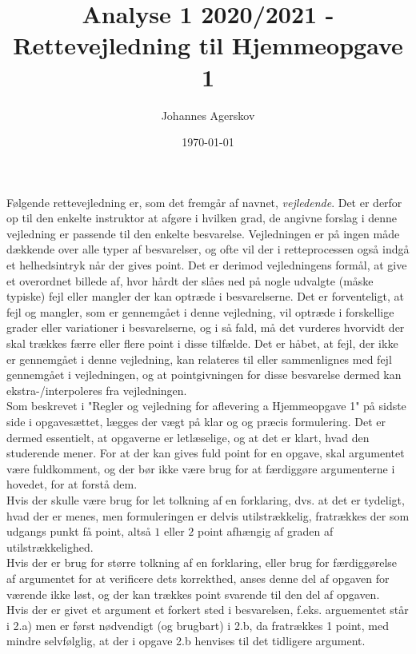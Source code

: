 \documentclass{article}
\title{Analyse 1 2020/2021 - Rettevejledning til Hjemmeopgave 1}
\author{Johannes Agerskov}
\date{\today}
\begin{document}
	
	\maketitle
Følgende rettevejledning er, som det fremgår af navnet, \emph{vejledende}. Det er derfor op til den enkelte instruktor at afgøre i hvilken grad, de angivne forslag i denne vejledning er passende til den enkelte besvarelse. Vejledningen er på ingen måde dækkende over alle typer af besvarelser, og ofte vil der i retteprocessen også indgå et helhedsintryk når der gives point. Det er derimod vejledningens formål, at give et overordnet billede af, hvor hårdt der slåes ned på nogle udvalgte (måske typiske) fejl eller mangler der kan optræde i besvarelserne. Det er forventeligt, at fejl og mangler, som er gennemgået i denne vejledning, vil optræde i forskellige grader eller variationer i besvarelserne, og i så fald, må det vurderes hvorvidt der skal trækkes færre eller flere point i disse tilfælde. Det er håbet, at fejl, der ikke er gennemgået i denne vejledning, kan relateres til eller sammenlignes med fejl gennemgået i vejledningen, og at pointgivningen for disse besvarelse dermed kan ekstra-/interpoleres fra vejledningen.
\vspace*{0.5cm}\\
Som beskrevet i "Regler og vejledning for aflevering a Hjemmeopgave 1" på sidste side i opgavesættet, lægges der vægt på klar og og præcis formulering. Det er dermed essentielt, at opgaverne er letlæselige, og at det er klart, hvad den studerende mener. For at der kan gives fuld point for en opgave, skal argumentet være fuldkomment, og der bør ikke være brug for at færdiggøre argumenterne i hovedet, for at forstå dem.
\vspace*{0.2cm}
\\
Hvis der skulle være brug for let tolkning af en forklaring, dvs. at det er tydeligt, hvad der er menes, men formuleringen er delvis utilstrækkelig, fratrækkes der som udgangs punkt få point, altså $ 1 $ eller $ 2 $ point afhængig af graden af utilstrækkelighed.
\vspace*{0.2cm}\\
Hvis der er brug for større tolkning af en forklaring, eller brug for færdiggørelse af argumentet for at verificere dets korrekthed, anses denne del af opgaven for værende ikke løst, og der kan trækkes point svarende til den del af opgaven.
\vspace*{0.2cm}\\
Hvis der er givet et argument et forkert sted i besvarelsen, f.eks. arguementet står i 2.a) men er først nødvendigt (og brugbart) i 2.b, da fratrækkes 1 point, med mindre selvfølglig, at der i opgave 2.b henvises til det tidligere argument.
\end{document}
